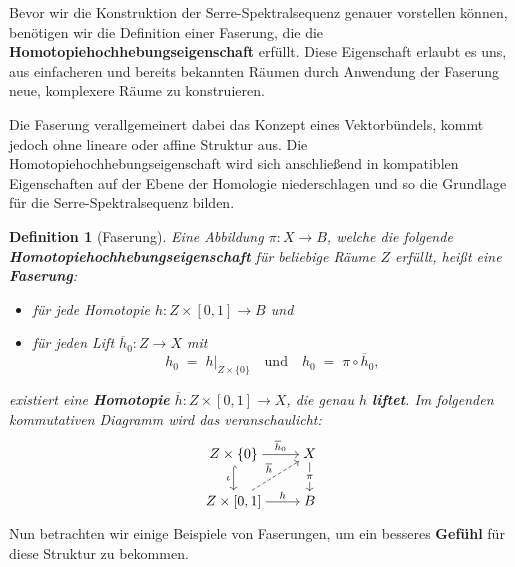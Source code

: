 \documentclass[12pt]{article}
\numberwithin{conj}{section}
\newtheorem{definition}[conj]{Definition}
\begin{document}
    Bevor wir die Konstruktion der Serre-Spektralsequenz genauer vorstellen können,
    benötigen wir die Definition einer Faserung, die die \textbf{Homotopiehochhebungseigenschaft}
    erfüllt. Diese Eigenschaft erlaubt es uns, aus einfacheren und bereits
    bekannten Räumen durch Anwendung der Faserung neue, komplexere Räume zu konstruieren.

    Die Faserung verallgemeinert dabei das Konzept eines Vektorbündels, kommt
    jedoch ohne lineare oder affine Struktur aus. Die Homotopiehochhebungseigenschaft
    wird sich anschließend in kompatiblen Eigenschaften auf der Ebene der Homologie
    niederschlagen und so die Grundlage für die Serre-Spektralsequenz bilden.

    \begin{definition}[Faserung]
        Eine Abbildung $\pi : X \to B$, welche die folgende \textbf{Homotopiehochhebungseigenschaft}
        für beliebige Räume $Z$ erfüllt, heißt eine \textbf{Faserung}:
        \begin{itemize}[noitemsep]
            \item für jede Homotopie $h : Z \times [0,1] \to B$ und

            \item für jeden Lift $\overline{h}_{0} : Z \to X$ mit
                \[
                    h_{0} \;=\; h\vert_{Z\times \{0\}}\quad\text{und}\quad h_{0} \;=\; \pi
                    \circ \overline{h}_{0},
                \]
        \end{itemize}
        existiert eine \textbf{Homotopie} $\overline{h}: Z \times [0,1] \to X$, die
        genau $h$ \textbf{liftet}. Im folgenden kommutativen Diagramm wird das
        veranschaulicht:
        \[
            \begin{tikzcd}
                [cramped] {Z\times\{0\}} & X \\ {Z\times[0,1]} & B \arrow["{\overline{h}_0}",
                from=1-1, to=1-2] \arrow["\iota"', hook, from=1-1, to=2-1] \arrow["\pi"{description},
                from=1-2, to=2-2] \arrow["{\overline{h}}", dashed, from=2-1, to=1-2] \arrow["h",
                from=2-1, to=2-2]
            \end{tikzcd}
        \]
    \end{definition}

    \noindent
    Nun betrachten wir einige Beispiele von Faserungen, um ein besseres \textbf{Gefühl}
    für diese Struktur zu bekommen.
\end{document}
